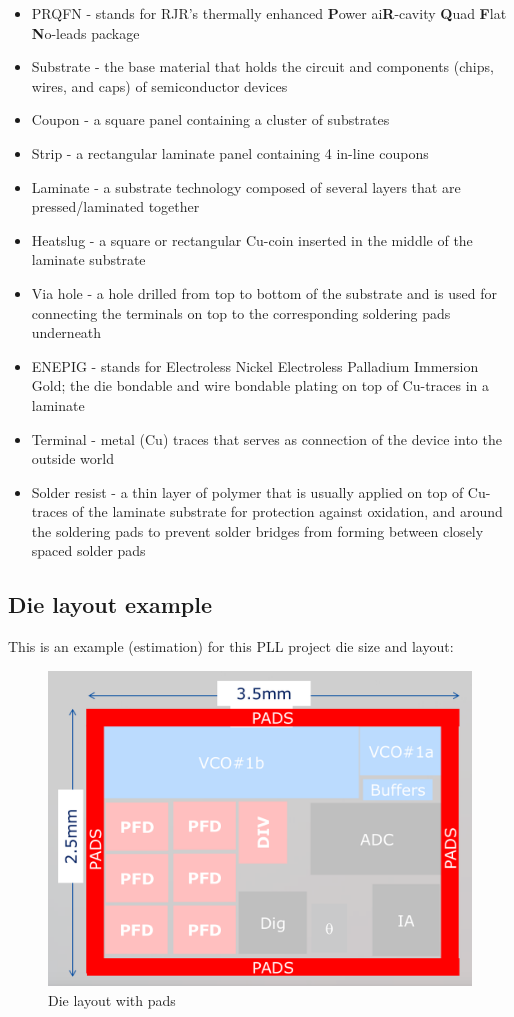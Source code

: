 \documentclass{article}
\begin{document}
\begin{itemize}
	\item PRQFN - stands for RJR's thermally enhanced \textbf{P}ower ai\textbf{R}-cavity \textbf{Q}uad \textbf{F}lat \textbf{N}o-leads package
	\item Substrate - the base material that holds the circuit and components (chips, wires, and caps) of semiconductor devices
	\item Coupon - a square panel containing a cluster of substrates
	\item Strip - a rectangular laminate panel containing 4 in-line coupons
	\item Laminate - a substrate technology composed of several layers that are pressed/laminated together
	\item Heatslug - a square or rectangular Cu-coin inserted in the middle of the laminate substrate
	\item Via hole - a hole drilled from top to bottom of the substrate and is used for connecting the terminals on top to the corresponding soldering pads underneath
	\item ENEPIG - stands for Electroless Nickel Electroless Palladium Immersion Gold; the die bondable and wire bondable plating on top of Cu-traces in a laminate
	\item Terminal - metal (Cu) traces that serves as connection of the device into the outside world
	\item Solder resist - a thin layer of polymer that is usually applied on top of Cu-traces of the laminate substrate for protection against oxidation, and around the soldering pads to prevent solder bridges from forming between closely spaced solder pads
\end{itemize}

\subsection{Die layout example}

This is an example (estimation) for this PLL project die size and layout:

\begin{figure}[ht!]
	\centering %
	\includegraphics[width=0.5\linewidth]{Figures/die-size-with-pads.png}
	\caption{Die layout with pads }
	\label{fig:die-size-with-pads}
\end{figure}
\end{document}
